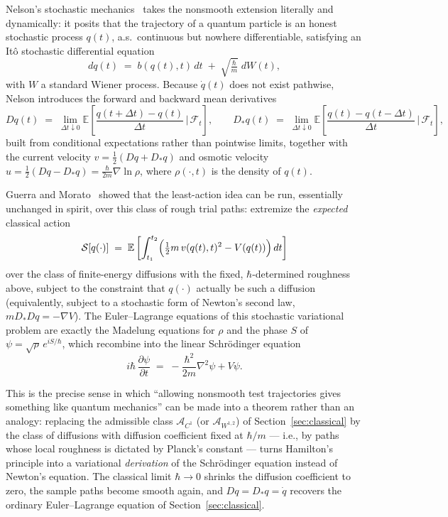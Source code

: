 \documentclass[11pt]{article}
\newcommand{\A}{\mathcal{A}}
\begin{document}
Nelson's stochastic mechanics~\cite{Nelson1966} takes the nonsmooth extension literally and dynamically: it posits that the trajectory of a quantum particle is an honest stochastic process $q(t)$, a.s.\ continuous but nowhere differentiable, satisfying an It\^o stochastic differential equation
\[
dq(t) \;=\; b(q(t),t)\,dt \;+\; \sqrt{\tfrac{\hbar}{m}}\; dW(t),
\]
with $W$ a standard Wiener process. Because $\dot q(t)$ does not exist pathwise, Nelson introduces the forward and backward mean derivatives
\[
Dq(t) \;=\; \lim_{\Delta t\downarrow 0} \mathbb{E}\!\left[\frac{q(t+\Delta t)-q(t)}{\Delta t}\,\Big|\,\mathcal F_t\right], \qquad
D_\ast q(t) \;=\; \lim_{\Delta t\downarrow 0} \mathbb{E}\!\left[\frac{q(t)-q(t-\Delta t)}{\Delta t}\,\Big|\,\mathcal F_t\right],
\]
built from conditional expectations rather than pointwise limits, together with the current velocity $v=\tfrac12(Dq+D_\ast q)$ and osmotic velocity $u=\tfrac12(Dq-D_\ast q)=\tfrac{\hbar}{2m}\nabla\ln\rho$, where $\rho(\cdot,t)$ is the density of $q(t)$.

Guerra and Morato~\cite{GuerraMorato1983} showed that the least-action idea can be run, essentially unchanged in spirit, over this class of rough trial paths: extremize the \emph{expected} classical action
\[
\mathcal{S}[q(\cdot)] \;=\; \mathbb{E}\left[\int_{t_1}^{t_2} \Bigl(\tfrac12 m\, v(q(t),t)^2 - V(q(t))\Bigr)\,dt\right]
\]
over the class of finite-energy diffusions with the fixed, $\hbar$-determined roughness above, subject to the constraint that $q(\cdot)$ actually be such a diffusion (equivalently, subject to a stochastic form of Newton's second law, $mD_\ast Dq = -\nabla V$). The Euler--Lagrange equations of this stochastic variational problem are exactly the Madelung equations for $\rho$ and the phase $S$ of $\psi=\sqrt\rho\,e^{iS/\hbar}$, which recombine into the linear Schr\"odinger equation
\[
i\hbar\,\frac{\partial\psi}{\partial t} \;=\; -\frac{\hbar^2}{2m}\nabla^2\psi + V\psi.
\]

This is the precise sense in which ``allowing nonsmooth test trajectories gives something like quantum mechanics'' can be made into a theorem rather than an analogy: replacing the admissible class $\A_{C^1}$ (or $\A_{W^{1,2}}$) of Section~\ref{sec:classical} by the class of diffusions with diffusion coefficient fixed at $\hbar/m$ --- i.e., by paths whose local roughness is dictated by Planck's constant --- turns Hamilton's principle into a variational \emph{derivation} of the Schr\"odinger equation instead of Newton's equation. The classical limit $\hbar\to 0$ shrinks the diffusion coefficient to zero, the sample paths become smooth again, and $Dq=D_\ast q=\dot q$ recovers the ordinary Euler--Lagrange equation of Section~\ref{sec:classical}.
\end{document}
